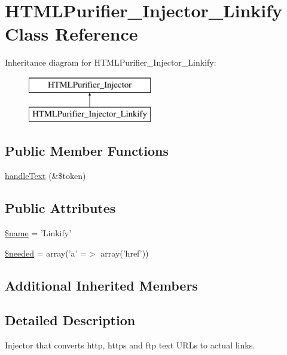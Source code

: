 \hypertarget{classHTMLPurifier__Injector__Linkify}{\section{H\+T\+M\+L\+Purifier\+\_\+\+Injector\+\_\+\+Linkify Class Reference}
\label{classHTMLPurifier__Injector__Linkify}
}
Inheritance diagram for H\+T\+M\+L\+Purifier\+\_\+\+Injector\+\_\+\+Linkify\+:\begin{figure}[H]
\begin{center}
\leavevmode
\includegraphics[height=2.000000cm]{classHTMLPurifier__Injector__Linkify}
\end{center}
\end{figure}
\subsection*{Public Member Functions}
\begin{DoxyCompactItemize}
\item 
\hyperlink{classHTMLPurifier__Injector__Linkify_a5ec9ffc2303f38569720d34ee0c5ad2b}{handle\+Text} (\&\$token)
\end{DoxyCompactItemize}
\subsection*{Public Attributes}
\begin{DoxyCompactItemize}
\item 
\hyperlink{classHTMLPurifier__Injector__Linkify_a33427eb3f9c651494045a9193aa482e9}{\$name} = 'Linkify'
\item 
\hyperlink{classHTMLPurifier__Injector__Linkify_a9faf391a03cafc6738aca303a50c123e}{\$needed} = array('a' =$>$ array('href'))
\end{DoxyCompactItemize}
\subsection*{Additional Inherited Members}


\subsection{Detailed Description}
Injector that converts http, https and ftp text U\+R\+Ls to actual links. 

